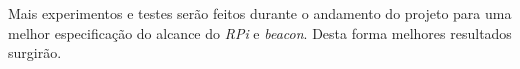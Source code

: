 \documentclass[
		12pt,				%
		openright,			%
		oneside,			%
		a4paper,			%
		chapter=TITLE,		%
		english,			%
		brazil				%
	]{abntex2}
\begin{document}
Mais experimentos e testes serão feitos durante o andamento do projeto para uma melhor especificação do alcance do \textit{RPi} e \textit{beacon}. Desta forma melhores resultados surgirão.






\end{document}
